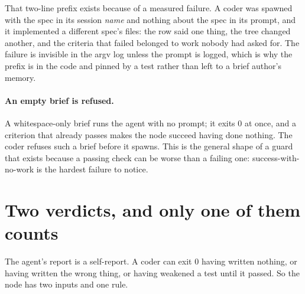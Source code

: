 That two-line prefix exists because of a measured failure. A coder was spawned with the spec
in its session \emph{name} and nothing about the spec in its prompt, and it implemented a
different spec's files: the row said one thing, the tree changed another, and the criteria
that failed belonged to work nobody had asked for. The failure is invisible in the argv log
unless the prompt is logged, which is why the prefix is in the code and pinned by a test
rather than left to a brief author's memory.

\paragraph{An empty brief is refused.} A whitespace-only brief runs the agent with no prompt;
it exits 0 at once, and a criterion that already passes makes the node succeed having done
nothing. The coder refuses such a brief before it spawns. This is the general shape of a guard
that exists because a passing check can be worse than a failing one: success-with-no-work is
the hardest failure to notice.

\section{Two verdicts, and only one of them counts}

The agent's report is a self-report. A coder can exit 0 having written nothing, or having
written the wrong thing, or having weakened a test until it passed. So the node has two inputs
and one rule.

\begin{center}
\end{center}

